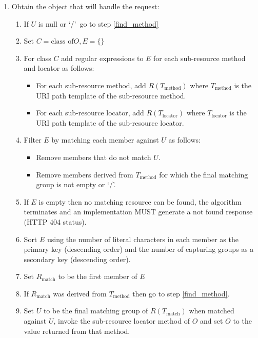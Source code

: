 \begin{enumerate}
\begin{enumerate}
\end{enumerate}

\item \label{find_object} Obtain the object that will handle the request:

\begin{enumerate}
\item \label{check_null} If $U$ is null or \lq/\rq\ go to step \ref{find_method}

\item Set $C=\mbox{class of} O, E=\{\}$

\item For class $C$ add regular expressions to $E$ for each sub-resource method and locator as follows:
\begin{itemize}
\item For each sub-resource method, add $R(T_{\mbox{method}})$ where $T_{\mbox{method}}$ is the URI path template of the sub-resource method.
\item For each sub-resource locator, add $R(T_{\mbox{locator}})$ where $T_{\mbox{locator}}$ is the  URI path template of the sub-resource locator.
\end{itemize}

\item Filter $E$ by matching each member against $U$ as follows:
\begin{itemize}
\item Remove members that do not match $U$.
\item Remove members derived from $T_{\mbox{method}}$ for which the final matching group is not empty or \lq/\rq.
\end{itemize}

\item If $E$ is empty then no matching resource can be found, the algorithm terminates and an implementation MUST generate a not found response (HTTP 404 status).

\item Sort $E$ using the number of literal characters in each member as the primary key (descending order) and the number of capturing groups as a secondary key (descending order).

\item Set $R_{\mbox{match}}$ to be the first member of $E$

\item If $R_{\mbox{match}}$ was derived from $T_{\mbox{method}}$ then go to step \ref{find_method}.

\item Set $U$ to be the final matching group of $R(T_{\mbox{match}})$ when matched against $U$,  invoke the sub-resource locator method of $O$ and set $O$ to the value returned from that method.


\end{enumerate}
\end{enumerate}
